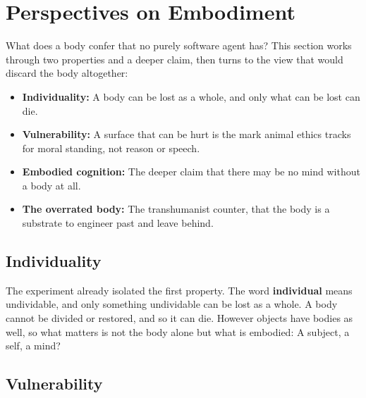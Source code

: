 \section*{Perspectives on Embodiment}

\noindent What does a body confer that no purely software agent has? This
section works through two properties and a deeper claim, then turns to the
view that would discard the body altogether:

\begin{itemize}
    \item \textbf{Individuality:} A body can be lost as a whole, and only
    what can be lost can die.
    \item \textbf{Vulnerability:} A surface that can be hurt is the mark
    animal ethics tracks for moral standing, not reason or speech.
    \item \textbf{Embodied cognition:} The deeper claim that there may be no
    mind without a body at all.
    \item \textbf{The overrated body:} The transhumanist counter, that the body
    is a substrate to engineer past and leave behind.
\end{itemize}



\subsection*{Individuality}


\noindent The experiment already isolated the first property. The word
\textbf{individual} means undividable, and only something undividable can be
lost as a whole. A body cannot be divided or restored, and so it can die.
However objects have bodies as well, so what matters is not the body alone but
what is embodied: A subject, a self, a mind?

\subsection*{Vulnerability}



